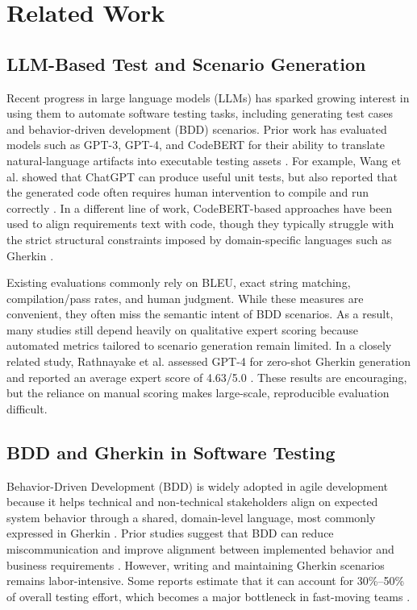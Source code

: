 \section{Related Work}
\label{sec:related-work}

\subsection{LLM-Based Test and Scenario Generation}

Recent progress in large language models (LLMs) has sparked growing interest in using them to automate software testing tasks, including generating test cases and behavior-driven development (BDD) scenarios. Prior work has evaluated models such as GPT-3, GPT-4, and CodeBERT for their ability to translate natural-language artifacts into executable testing assets \cite{wang2024llm, yuan2023chattester, siddiq2023exploring}. For example, Wang et al. showed that ChatGPT can produce useful unit tests, but also reported that the generated code often requires human intervention to compile and run correctly \cite{wang2024llm}. In a different line of work, CodeBERT-based approaches have been used to align requirements text with code, though they typically struggle with the strict structural constraints imposed by domain-specific languages such as Gherkin \cite{bareiss2022code}.

Existing evaluations commonly rely on BLEU, exact string matching, compilation/pass rates, and human judgment. While these measures are convenient, they often miss the semantic intent of BDD scenarios. As a result, many studies still depend heavily on qualitative expert scoring because automated metrics tailored to scenario generation remain limited. In a closely related study, Rathnayake et al. assessed GPT-4 for zero-shot Gherkin generation and reported an average expert score of 4.63/5.0 \cite{rathnayake2026llm}. These results are encouraging, but the reliance on manual scoring makes large-scale, reproducible evaluation difficult.

\subsection{BDD and Gherkin in Software Testing}

Behavior-Driven Development (BDD) is widely adopted in agile development because it helps technical and non-technical stakeholders align on expected system behavior through a shared, domain-level language, most commonly expressed in Gherkin \cite{smart2014bdd}. Prior studies suggest that BDD can reduce miscommunication and improve alignment between implemented behavior and business requirements \cite{solis2011study}. However, writing and maintaining Gherkin scenarios remains labor-intensive. Some reports estimate that it can account for 30\%--50\% of overall testing effort, which becomes a major bottleneck in fast-moving teams \cite{irshad2021systematic}.

